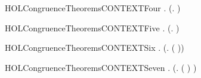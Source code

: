 \begin{SaveVerbatim}{HOLCongruenceTheoremsCONTEXTFour}
\HOLTokenTurnstile{} \HOLSymConst{\HOLTokenForall{}} .   \HOLSymConst{\HOLTokenConj{}}   \HOLSymConst{\HOLTokenImp{}}  (\HOLTokenLambda{}.   \HOLSymConst{+}  )
\end{SaveVerbatim}
\newcommand{\HOLCongruenceTheoremsCONTEXTFour}{\UseVerbatim{HOLCongruenceTheoremsCONTEXTFour}}
\begin{SaveVerbatim}{HOLCongruenceTheoremsCONTEXTFive}
\HOLTokenTurnstile{} \HOLSymConst{\HOLTokenForall{}} .   \HOLSymConst{\HOLTokenConj{}}   \HOLSymConst{\HOLTokenImp{}}  (\HOLTokenLambda{}.   \HOLSymConst{\ensuremath{\parallel}}  )
\end{SaveVerbatim}
\newcommand{\HOLCongruenceTheoremsCONTEXTFive}{\UseVerbatim{HOLCongruenceTheoremsCONTEXTFive}}
\begin{SaveVerbatim}{HOLCongruenceTheoremsCONTEXTSix}
\HOLTokenTurnstile{} \HOLSymConst{\HOLTokenForall{}} .   \HOLSymConst{\HOLTokenImp{}}  (\HOLTokenLambda{}. \HOLConst{\ensuremath{\nu}}  ( ))
\end{SaveVerbatim}
\newcommand{\HOLCongruenceTheoremsCONTEXTSix}{\UseVerbatim{HOLCongruenceTheoremsCONTEXTSix}}
\begin{SaveVerbatim}{HOLCongruenceTheoremsCONTEXTSeven}
\HOLTokenTurnstile{} \HOLSymConst{\HOLTokenForall{}} .   \HOLSymConst{\HOLTokenImp{}}  (\HOLTokenLambda{}.  ( ) )
\end{SaveVerbatim}
\newcommand{\HOLCongruenceTheoremsCONTEXTSeven}{\UseVerbatim{HOLCongruenceTheoremsCONTEXTSeven}}

